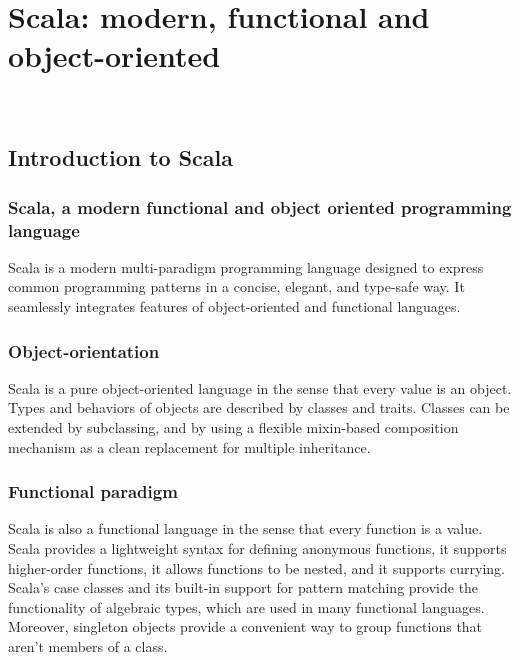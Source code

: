 
\chapter{Scala: modern, functional and object-oriented}
\label{cap:scala-language}

\\

\section{Introduction to Scala}
\subsection{Scala, a modern functional and object oriented programming language}
Scala is a modern multi-paradigm programming language designed to express common programming patterns in a concise, elegant, and type-safe way.
It seamlessly integrates features of object-oriented and functional languages.

\subsection{Object-orientation}
Scala is a pure object-oriented language in the sense that every value is an object. Types and behaviors of objects are described by classes and traits.
Classes can be extended by subclassing, and by using a flexible \gls{mixin-based composition} mechanism as a clean replacement for multiple inheritance.

\subsection{Functional paradigm}
Scala is also a functional language in the sense that every function is a value.
Scala provides a lightweight syntax for defining anonymous functions, it supports higher-order functions, it allows functions to be nested, and it supports currying.
Scala's case classes and its built-in support for pattern matching provide the functionality of algebraic types, which are used in many functional languages.
Moreover, singleton objects provide a convenient way to group functions that aren't members of a class.

